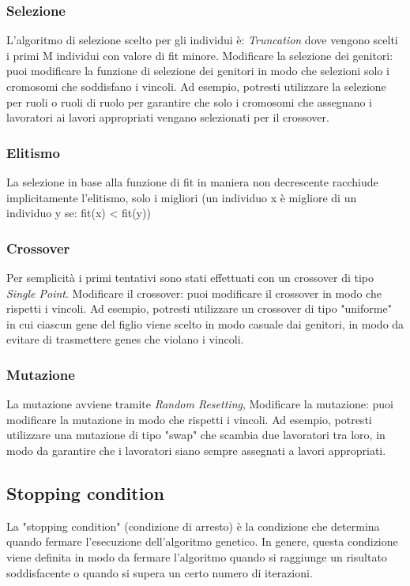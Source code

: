 \subsubsection{Selezione}
L'algoritmo di selezione scelto per gli individui è: \textit{Truncation} dove vengono scelti i primi M individui con valore di fit minore.
Modificare la selezione dei genitori: puoi modificare la funzione di selezione dei genitori in modo che selezioni solo i cromosomi che soddisfano i vincoli. Ad esempio, potresti utilizzare la selezione per ruoli o ruoli di ruolo per garantire che solo i cromosomi che assegnano i lavoratori ai lavori appropriati vengano selezionati per il crossover.

\subsubsection{Elitismo} %
La selezione in base alla funzione di fit in maniera non decrescente racchiude implicitamente l'elitismo, solo i migliori (un individuo x è migliore di un individuo y se: fit(x) < fit(y))

\subsubsection{Crossover}
Per semplicità i primi tentativi sono stati effettuati con un crossover di tipo \textit{Single Point}.
Modificare il crossover: puoi modificare il crossover in modo che rispetti i vincoli. Ad esempio, potresti utilizzare un crossover di tipo "uniforme" in cui ciascun gene del figlio viene scelto in modo casuale dai genitori, in modo da evitare di trasmettere genes che violano i vincoli.


\subsubsection{Mutazione}
La mutazione avviene tramite \textit{Random Resetting}, %
Modificare la mutazione: puoi modificare la mutazione in modo che rispetti i vincoli. Ad esempio, potresti utilizzare una mutazione di tipo "swap" che scambia due lavoratori tra loro, in modo da garantire che i lavoratori siano sempre assegnati a lavori appropriati.

\subsection{Stopping condition}
La "stopping condition" (condizione di arresto) è la condizione che determina quando fermare l'esecuzione dell'algoritmo genetico. In genere, questa condizione viene definita in modo da fermare l'algoritmo quando si raggiunge un risultato soddisfacente o quando si supera un certo numero di iterazioni.

